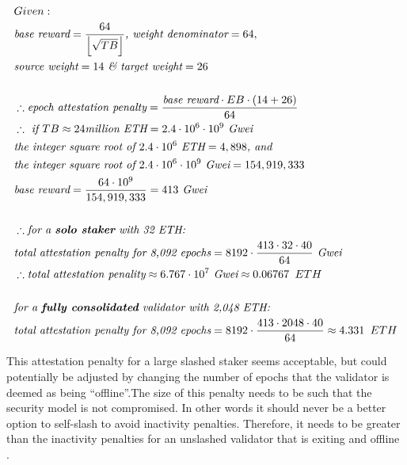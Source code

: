 \documentclass{article}
\begin{document}
\begin{equation*}
\begin{split}
& Given:\\
& \textit{base reward} = \frac{64}{ \left\lfloor \sqrt{TB} \right\rfloor} \textit{, weight denominator} = 64, \\
& \textit{source weight} = 14 \textit{  \& target weight} = 26\\
& \\
& \therefore \textit{epoch attestation penalty} = \frac{\textit{base reward} \cdot  EB \cdot  (14 + 26)}{64} \\
& \therefore \textit{ if } TB \approx 24 \textit{million ETH} = 2.4 \cdot  10^6 \cdot  10^9 \textit{ Gwei}\\
& \textit{the integer square root of } 2.4 \cdot  10^6 \textit{ ETH} = 4,898 \textit{, and} \\
& \textit{the integer square root of } 2.4 \cdot  10^6 \cdot  10^9 \textit{ Gwei} = 154,919,333 \\
& \textit{base reward} = \frac{64 \cdot  10^9}{154,919,333} = 413 \textit{ Gwei} \\
& \\
& \therefore \textit{for a \textbf{solo staker} with 32 ETH:} \\
& \textit{total attestation penalty for 8,092 epochs} = 8192 \cdot  \frac{413\cdot 32\cdot 40}{64}  \textit{ Gwei}\\
& \therefore \textit{total attestation penality} \approx 6.767 \cdot  10^7 \textit{ Gwei} \approx 0.06767 \texttt{ } ETH \\
& \\
& \textit{for a \textbf{fully consolidated} validator with 2,048 ETH:} \\
& \textit{total attestation penalty for 8,092 epochs} = 8192 \cdot  \frac{413\cdot 2048\cdot 40}{64}\approx 4.331 \texttt{ } ETH \\
\end{split}
\end{equation*}

This attestation penalty for a large slashed staker seems acceptable, but could
potentially be adjusted by changing the number of epochs that the validator is
deemed as being ``offline''.The size of this penalty needs to be such that the
security model is not compromised. In other words it should never be a better
option to self-slash to avoid inactivity penalties. Therefore, it needs to be
greater than the inactivity penalties for an unslashed validator that is
exiting and offline \cite{Neuder2023d}.
\end{document}
